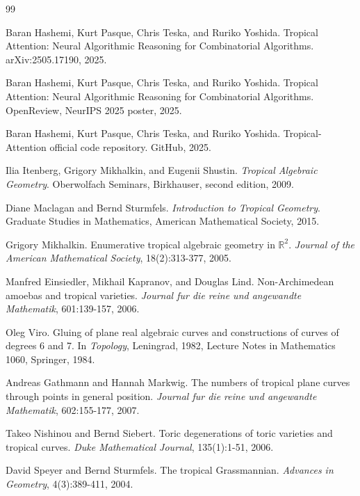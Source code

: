 \documentclass[11pt]{article}
\begin{document}
\begin{thebibliography}{99}

Baran Hashemi, Kurt Pasque, Chris Teska, and Ruriko Yoshida.
\newblock Tropical Attention: Neural Algorithmic Reasoning for Combinatorial Algorithms.
\newblock arXiv:2505.17190, 2025.

Baran Hashemi, Kurt Pasque, Chris Teska, and Ruriko Yoshida.
\newblock Tropical Attention: Neural Algorithmic Reasoning for Combinatorial Algorithms.
\newblock OpenReview, NeurIPS 2025 poster, 2025.

Baran Hashemi, Kurt Pasque, Chris Teska, and Ruriko Yoshida.
\newblock Tropical-Attention official code repository.
\newblock GitHub, 2025.

Ilia Itenberg, Grigory Mikhalkin, and Eugenii Shustin.
\newblock \emph{Tropical Algebraic Geometry}.
\newblock Oberwolfach Seminars, Birkhauser, second edition, 2009.

Diane Maclagan and Bernd Sturmfels.
\newblock \emph{Introduction to Tropical Geometry}.
\newblock Graduate Studies in Mathematics, American Mathematical Society, 2015.

Grigory Mikhalkin.
\newblock Enumerative tropical algebraic geometry in \(\mathbb R^2\).
\newblock \emph{Journal of the American Mathematical Society}, 18(2):313-377, 2005.

Manfred Einsiedler, Mikhail Kapranov, and Douglas Lind.
\newblock Non-Archimedean amoebas and tropical varieties.
\newblock \emph{Journal fur die reine und angewandte Mathematik}, 601:139-157, 2006.

Oleg Viro.
\newblock Gluing of plane real algebraic curves and constructions of curves of degrees 6 and 7.
\newblock In \emph{Topology}, Leningrad, 1982, Lecture Notes in Mathematics 1060, Springer, 1984.

Andreas Gathmann and Hannah Markwig.
\newblock The numbers of tropical plane curves through points in general position.
\newblock \emph{Journal fur die reine und angewandte Mathematik}, 602:155-177, 2007.

Takeo Nishinou and Bernd Siebert.
\newblock Toric degenerations of toric varieties and tropical curves.
\newblock \emph{Duke Mathematical Journal}, 135(1):1-51, 2006.

David Speyer and Bernd Sturmfels.
\newblock The tropical Grassmannian.
\newblock \emph{Advances in Geometry}, 4(3):389-411, 2004.


\end{thebibliography}
\end{document}
